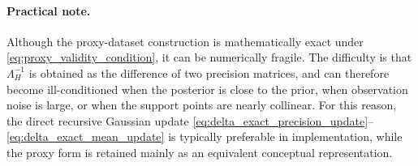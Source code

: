 \documentclass{article}
\begin{document}
\paragraph{Practical note.}
Although the proxy-dataset construction is mathematically exact under \eqref{eq:proxy_validity_condition}, it can be numerically fragile. The difficulty is that $\Lambda_H^{-1}$ is obtained as the difference of two precision matrices, and can therefore become ill-conditioned when the posterior is close to the prior, when observation noise is large, or when the support points are nearly collinear. For this reason, the direct recursive Gaussian update \eqref{eq:delta_exact_precision_update}--\eqref{eq:delta_exact_mean_update} is typically preferable in implementation, while the proxy form is retained mainly as an equivalent conceptual representation.

\end{document}
